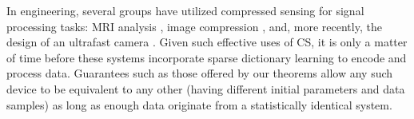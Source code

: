 \documentclass[9pt,twocolumn]{pnas-new}
\newtheorem{remark}{Remark}
\begin{document}


In engineering, several groups have utilized compressed sensing for signal processing tasks: MRI analysis \cite{lustig2008compressed},  image compression \cite{Duarte08}, and, more recently, the design of an ultrafast camera \cite{Gao14}. Given such effective uses of CS, it is only a matter of time before these systems incorporate sparse dictionary learning to encode and process data. Guarantees such as those offered by our theorems allow any such device to be equivalent to any other (having different initial parameters and data samples) as long as enough data originate from a statistically identical system.



\showacknow %




\end{document}
